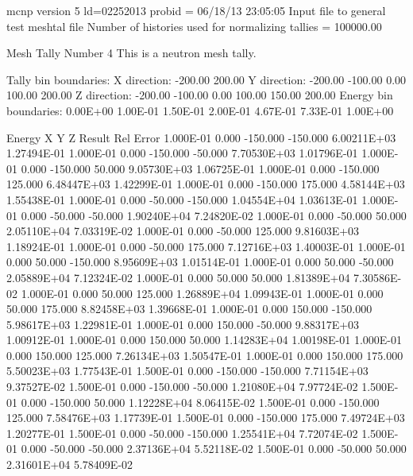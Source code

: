 mcnp   version 5     ld=02252013  probid =  06/18/13 23:05:05 
 Input file to general test meshtal file                                         
 Number of histories used for normalizing tallies =        100000.00

 Mesh Tally Number         4
 This is a neutron mesh tally.

 Tally bin boundaries:
    X direction:   -200.00    200.00
    Y direction:   -200.00   -100.00      0.00    100.00    200.00
    Z direction:   -200.00   -100.00      0.00    100.00    150.00    200.00
    Energy bin boundaries: 0.00E+00 1.00E-01 1.50E-01 2.00E-01 4.67E-01 7.33E-01 1.00E+00

   Energy         X         Y         Z     Result     Rel Error
  1.000E-01     0.000  -150.000  -150.000 6.00211E+03 1.27494E-01
  1.000E-01     0.000  -150.000   -50.000 7.70530E+03 1.01796E-01
  1.000E-01     0.000  -150.000    50.000 9.05730E+03 1.06725E-01
  1.000E-01     0.000  -150.000   125.000 6.48447E+03 1.42299E-01
  1.000E-01     0.000  -150.000   175.000 4.58144E+03 1.55438E-01
  1.000E-01     0.000   -50.000  -150.000 1.04554E+04 1.03613E-01
  1.000E-01     0.000   -50.000   -50.000 1.90240E+04 7.24820E-02
  1.000E-01     0.000   -50.000    50.000 2.05110E+04 7.03319E-02
  1.000E-01     0.000   -50.000   125.000 9.81603E+03 1.18924E-01
  1.000E-01     0.000   -50.000   175.000 7.12716E+03 1.40003E-01
  1.000E-01     0.000    50.000  -150.000 8.95609E+03 1.01514E-01
  1.000E-01     0.000    50.000   -50.000 2.05889E+04 7.12324E-02
  1.000E-01     0.000    50.000    50.000 1.81389E+04 7.30586E-02
  1.000E-01     0.000    50.000   125.000 1.26889E+04 1.09943E-01
  1.000E-01     0.000    50.000   175.000 8.82458E+03 1.39668E-01
  1.000E-01     0.000   150.000  -150.000 5.98617E+03 1.22981E-01
  1.000E-01     0.000   150.000   -50.000 9.88317E+03 1.00912E-01
  1.000E-01     0.000   150.000    50.000 1.14283E+04 1.00198E-01
  1.000E-01     0.000   150.000   125.000 7.26134E+03 1.50547E-01
  1.000E-01     0.000   150.000   175.000 5.50023E+03 1.77543E-01
  1.500E-01     0.000  -150.000  -150.000 7.71154E+03 9.37527E-02
  1.500E-01     0.000  -150.000   -50.000 1.21080E+04 7.97724E-02
  1.500E-01     0.000  -150.000    50.000 1.12228E+04 8.06415E-02
  1.500E-01     0.000  -150.000   125.000 7.58476E+03 1.17739E-01
  1.500E-01     0.000  -150.000   175.000 7.49724E+03 1.20277E-01
  1.500E-01     0.000   -50.000  -150.000 1.25541E+04 7.72074E-02
  1.500E-01     0.000   -50.000   -50.000 2.37136E+04 5.52118E-02
  1.500E-01     0.000   -50.000    50.000 2.31601E+04 5.78409E-02
